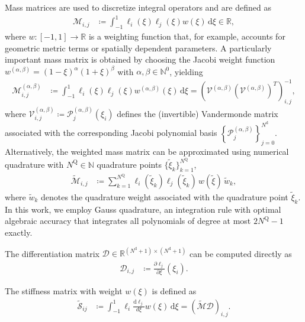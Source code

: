 Mass matrices are used to discretize integral operators and are defined as
\begin{align}
\label{eq:operator_mass_matrix}
\mathcal{M}_{i, j} &\coloneq \int_{-1}^{1} \ell_i(\xi) \ell_j(\xi) w(\xi) \,\mathrm{d}\xi \in\mathbb{R},
\end{align}
where $w\colon [-1,1]\to\mathbb{R}$ is a weighting function that, for example, accounts for geometric metric terms or spatially dependent parameters.
A particularly important mass matrix is obtained by choosing the Jacobi weight function $w^{(\alpha,\beta)} = (1-\xi)^\alpha (1+\xi)^\beta$ with $\alpha,\beta\in\mathbb{N}^0$, yielding
\begin{align}
\label{eq:operator_exact_jacobi_mass_matrix}
\mathcal{M}^{(\alpha, \beta)}_{i, j} &\coloneq \int_{-1}^{1} \ell_i(\xi) \ell_j(\xi) w^{(\alpha, \beta)}(\xi) \,\mathrm{d}\xi = \left(\mathcal{V}^{(\alpha, \beta)} \left( \mathcal{V}^{(\alpha, \beta)} \right)^T \right)^{-1}_{i,j},
\end{align}
where $\mathcal{V}^{(\alpha, \beta)}_{i, j} \coloneq \mathcal{P}^{(\alpha, \beta)}_j(\xi_i)$ defines the (invertible) Vandermonde matrix associated with the corresponding Jacobi polynomial basis $\left\{\mathcal{P}^{(\alpha, \beta)}_j\right\}_{j=0}^{N^\mathrm{d}}$. 
Alternatively, the weighted mass matrix can be approximated using numerical quadrature with $N^\mathrm{Q}\in\mathbb{N}$ quadrature points $\{\tilde{\xi}_k\}_{k=1}^{N^\mathrm{Q}}$,
\begin{align}
\label{eq:operator_gauss_mass_matrix}
\tilde{\mathcal{M}}_{i,j} &\coloneq \sum_{k=1}^{N^\mathrm{Q}} \ell_i(\tilde{\xi}_k) \ell_j(\tilde{\xi}_k) \, w(\tilde{\xi}) \, \tilde{w}_k,
\end{align}
where $\tilde{w}_k$ denotes the quadrature weight associated with the quadrature point $\tilde{\xi}_k$. In this work, we employ Gauss quadrature, an integration rule with optimal algebraic accuracy that integrates all polynomials of degree at most $2N^\mathrm{Q}-1$ exactly.

The differentiation matrix $\mathcal{D} \in \mathbb{R}^{({N^\mathrm{d}} + 1) \times ({N^\mathrm{d}} + 1)}$ can be computed directly as
\begin{align}
\label{eq:operator_differentiation_matrix}
\mathcal{D}_{i, j} &\coloneq \frac{\partial \ell_j}{\partial \xi}(\xi_i).
\end{align}

The stiffness matrix with weight $w(\xi)$ is defined as
\begin{align}
\label{eq:operator_stiffness_matrix}
\tilde{\mathcal{S}}_{ij} &\coloneq \int_{-1}^{1} \ell_i \frac{\mathrm{d} \ell_j}{d \xi} w(\xi) \,\mathrm{d}\xi = \left( \tilde{\mathcal{M}} \mathcal{D} \right)_{i,j}.
\end{align}

